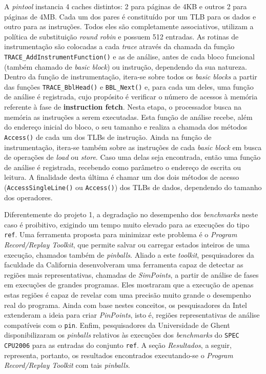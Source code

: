 \documentclass[12pt]{article}
\begin{document}
A \textit{pintool} instancia 4 caches distintos: 2 para páginas de 4KB e outros
2 para páginas de 4MB. Cada um dos pares é constituído por um TLB para os dados
e outro para as instruções. Todos eles são completamente associativos, utilizam
a política de substituição \textit{round robin} e possuem 512 entradas. As
rotinas de instrumentação são colocadas a cada \textit{trace} através da chamada
da função \texttt{TRACE\_AddInstrumentFunction()} e as de análise, antes de
cada bloco funcional (também chamado de \textit{basic block}) ou instrução,
dependendo da sua natureza. Dentro da função de instrumentação, itera-se sobre
todos os \textit{basic blocks} a partir das funções \texttt{TRACE\_BblHead()} e
\texttt{BBL\_Next()} e, para cada um deles, uma função de análise é registrada,
cujo propósito é verificar o número de acessos à memória referente à fase de
\textbf{instruction fetch}. Nesta etapa, o processador busca na memória as
instruções a serem executadas. Esta função de análise recebe, além do endereço
inicial do bloco, o seu tamanho e realiza a chamada dos métodos
\texttt{Access()} de cada um dos TLBs de instrução. Ainda na função de
instrumentação, itera-se também sobre as instruções de cada \textit{basic block}
em busca de operações de \textit{load} ou \textit{store}. Caso uma delas seja
encontrada, então uma função de análise é registrada, recebendo como parâmetro o
endereço de escrita ou leitura. A finalidade desta última é chamar um dos
dois métodos de acesso (\texttt{AccessSingleLine()} ou \texttt{Access()}) dos
TLBs de dados, dependendo do tamanho dos operadores.

Diferentemente do projeto 1, a degradação no desempenho dos
\textit{benchmarks} neste caso é proibitivo, exigindo um tempo muito elevado
para as execuções do tipo \texttt{ref}. Uma ferramenta proposta para minimizar
este problema é o \textit{Program Record/Replay Toolkit}, que permite
salvar ou carregar estados inteiros de uma execução, chamados também de
\textit{pinballs}. Aliado a este \textit{toolkit},
pesquisadores da faculdade da California desenvolveram uma ferramenta capaz de
detectar as regiões mais representativas, chamadas de \textit{SimPoints}, a
partir de análise de fases em execuções de grandes programas. Eles mostraram
que a execução de apenas estas regiões é capaz de revelar com uma precisão muito
grande o desempenho real do programa. Ainda com base nestes conceitos, os
pesquisadores da Intel extenderam a ideia para criar \textit{PinPoints}, isto é,
regiões representativas de análise compatíveis com o \texttt{pin}. Enfim,
pesquisadores da Universidade de Ghent disponibilizaram os \textit{pinballs}
relativos às execuções dos \textit{benchmarks} do \texttt{SPEC CPU2006} para as
entradas do conjunto \texttt{ref}. A seção \textit{Resultados}, a seguir,
representa, portanto, os resultados encontrados executando-se o \textit{Program
Record/Replay Toolkit} com tais \textit{pinballs}.
\end{document}
